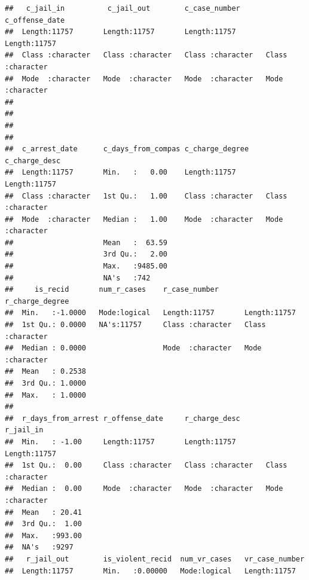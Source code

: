 \documentclass[
]{article}
\begin{document}
\begin{verbatim}
##   c_jail_in          c_jail_out        c_case_number      c_offense_date    
##  Length:11757       Length:11757       Length:11757       Length:11757      
##  Class :character   Class :character   Class :character   Class :character  
##  Mode  :character   Mode  :character   Mode  :character   Mode  :character  
##                                                                             
##                                                                             
##                                                                             
##                                                                             
##  c_arrest_date      c_days_from_compas c_charge_degree    c_charge_desc     
##  Length:11757       Min.   :   0.00    Length:11757       Length:11757      
##  Class :character   1st Qu.:   1.00    Class :character   Class :character  
##  Mode  :character   Median :   1.00    Mode  :character   Mode  :character  
##                     Mean   :  63.59                                         
##                     3rd Qu.:   2.00                                         
##                     Max.   :9485.00                                         
##                     NA's   :742                                             
##     is_recid       num_r_cases    r_case_number      r_charge_degree   
##  Min.   :-1.0000   Mode:logical   Length:11757       Length:11757      
##  1st Qu.: 0.0000   NA's:11757     Class :character   Class :character  
##  Median : 0.0000                  Mode  :character   Mode  :character  
##  Mean   : 0.2538                                                       
##  3rd Qu.: 1.0000                                                       
##  Max.   : 1.0000                                                       
##                                                                        
##  r_days_from_arrest r_offense_date     r_charge_desc       r_jail_in        
##  Min.   : -1.00     Length:11757       Length:11757       Length:11757      
##  1st Qu.:  0.00     Class :character   Class :character   Class :character  
##  Median :  0.00     Mode  :character   Mode  :character   Mode  :character  
##  Mean   : 20.41                                                             
##  3rd Qu.:  1.00                                                             
##  Max.   :993.00                                                             
##  NA's   :9297                                                               
##   r_jail_out        is_violent_recid  num_vr_cases   vr_case_number    
##  Length:11757       Min.   :0.00000   Mode:logical   Length:11757      

\end{verbatim}
\end{document}
